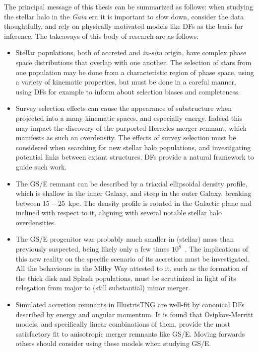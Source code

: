 The principal message of this thesis can be summarized as follows: when studying the stellar halo in the \textit{Gaia} era it is important to slow down, consider the data thoughtfully, and rely on physically motivated models like DFs as the basis for inference. The takeaways of this body of research are as follows:

\begin{itemize}
    \item Stellar populations, both of accreted and \textit{in-situ} origin, have complex phase space distributions that overlap with one another. The selection of stars from one population may be done from a characteristic region of phase space, using a variety of kinematic properties, but must be done in a careful manner, using DFs for example to inform about selection biases and completeness.
    \item Survey selection effects can cause the appearance of substructure when projected into a many kinematic spaces, and especially energy. Indeed this may impact the discovery of the purported Heracles merger remnant, which manifests as such an overdensity. The effects of survey selection must be considered when searching for new stellar halo populations, and investigating potential links between extant structures. DFs provide a natural framework to guide such work.
    \item The GS/E remnant can be described by a triaxial ellipsoidal density profile, which is shallow in the inner Galaxy, and steep in the outer Galaxy, breaking between $15-25$~kpc. The density profile is rotated in the Galactic plane and inclined with respect to it, aligning with several notable stellar halo overdensities.
    \item The GS/E progenitor was probably much smaller in (stellar) mass than previously suspected, being likely only a few times $10^{8}$~\Msun. The implications of this new reality on the specific scenario of its accretion must be investigated. All the behaviours in the Milky Way attested to it, such as the formation of the thick disk and Splash populations, must be scrutinized in light of its relegation from major to (still substantial) minor merger.
    \item Simulated accretion remnants in IllustrisTNG are well-fit by canonical DFs described by energy and angular momentum. It is found that Osipkov-Merritt models, and specifically linear combinations of them, provide the most satisfactory fit to anisotropic merger remnants like GS/E. Moving forwards others should consider using these models when studying GS/E.
\end{itemize}


